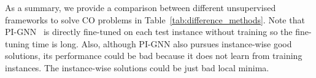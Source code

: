 
As a summary, we provide a comparison between different unsupervised frameworks to solve CO problems in Table~\ref{tab:difference_methods}. Note that PI-GNN~\citep{schuetz2022combinatorial} is directly fine-tuned on each test instance without training so the fine-tuning time is long. Also, although PI-GNN also pursues instance-wise good solutions, its performance could be bad because it does not learn from training instances. The instance-wise solutions could be just bad local minima.  












